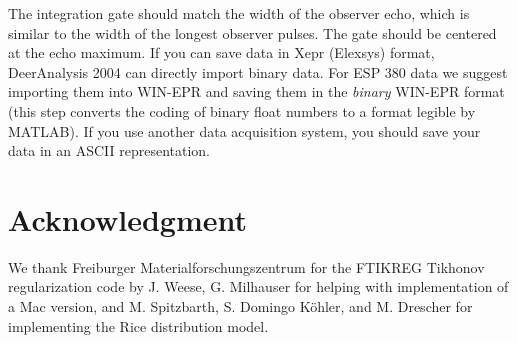 \documentclass{article}
\begin{document}
The integration gate should match the width of the observer echo, which is similar to the width of the longest observer pulses. The gate should be centered at the echo maximum. If you can save data in Xepr (Elexsys) format, DeerAnalysis 2004 can directly import binary data. For ESP 380 data we suggest importing them into WIN-EPR and saving them in the {\em binary} WIN-EPR format (this step converts the coding of binary float numbers to a format legible by MATLAB). If you use another data acquisition system, you should save your data in an ASCII representation. 

\section*{Acknowledgment}
\label{acknowledge}
We thank Freiburger Materialforschungszentrum for the FTIKREG Tikhonov regularization code by J. Weese, G. Milhauser for helping with implementation of a Mac version, and M. Spitzbarth, S. Domingo K\"ohler, and M. Drescher for implementing the Rice distribution model.    
 

\end{document}
